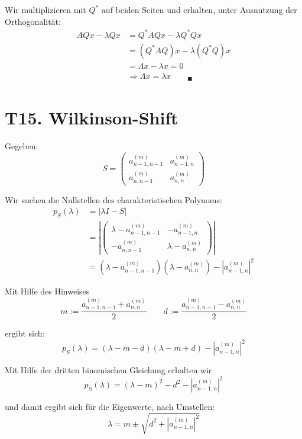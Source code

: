 \documentclass[11pt]{article}
\theoremstyle{plain}
\theoremstyle{definition}
\renewcommand{\a}{\"{a}}
\renewcommand{\u}{\"{u}}
\begin{document}
Wir multiplizieren mit $Q^*$ auf beiden Seiten und erhalten, unter Ausnutzung der Orthogonalit\a t:
\begin{align*}
AQx-\lambda Qx &= Q^*AQx-\lambda Q^*Qx \\
&= (Q^*AQ)x-\lambda (Q^*Q)x \\
&= \Lambda x - \lambda x  = 0 \\
&\Rightarrow  \Lambda x = \lambda x \qquad _\blacksquare
\end{align*}

\section*{T15. Wilkinson-Shift}
Gegeben:
\begin{equation}
S= 
\begin{pmatrix}
a_{n-1,n-1}^{(m)} & a_{n-1,n}^{(m)} \\
a_{n,n-1}^{(m)} & a_{n,n}^{(m)} 
\end{pmatrix}
\end{equation}

Wir suchen die Nullstellen des charakteristischen Polynoms:
\begin{align}
p_S(\lambda) &= |\lambda I-S| \\
&= \left| 
\begin{pmatrix}
\lambda - a_{n-1,n-1}^{(m)} & -a_{n-1,n}^{(m)} \\
-a_{n,n-1}^{(m)} & \lambda - a_{n,n}^{(m)} 
\end{pmatrix}
\right| \\
&= (\lambda - a_{n-1,n-1}^{(m)})(\lambda - a_{n,n}^{(m)}) - |a_{n-1,n}^{(m)}|^2
\end{align}

Mit Hilfe des Hinweises
\begin{equation}
m:=\frac{a_{n-1,n-1}^{(m)}+a_{n,n}^{(m)}}{2} \qquad d:=\frac{a_{n-1,n-1}^{(m)}-a_{n,n}^{(m)}}{2}
\end{equation}

ergibt sich:
\begin{equation}
p_S(\lambda) = (\lambda -m -d)(\lambda - m + d) - |a_{n-1,n}^{(m)}|^2
\end{equation}

Mit Hilfe der dritten binomischen Gleichung erhalten wir
\begin{equation}
p_S(\lambda) = (\lambda - m)^2 - d^2 - |a_{n-1,n}^{(m)}|^2
\end{equation}

und damit ergibt sich f\u r die Eigenwerte, nach Umstellen:
\begin{equation}
\lambda = m \pm \sqrt{d^2 + |a_{n-1,n}^{(m)}|^2}
\end{equation}
\end{document}
